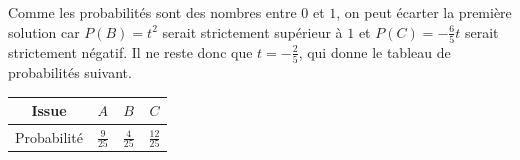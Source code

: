 {	Comme les probabilités sont des nombres entre $0$ et $1$, on peut écarter la première solution car $P(B) = t^2$ serait strictement supérieur à $1$ et $P(C) = -\frac65t$ serait strictement négatif.
	Il ne reste donc que $t = -\frac25$, qui donne le tableau de probabilités suivant.
	\begin{center}
	\begin{tabular}{|c|c|c|c|} \hline
		Issue & $A$ & $B$ & $C$ \\ \hline
		Probabilité & $\frac9{25}$ & $\frac4{25}$ & $\frac{12}{25}$ \\ \hline
	\end{tabular}
	\end{center}
}



